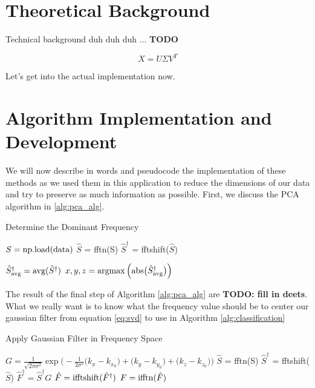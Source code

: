 \documentclass[11pt]{amsart}
\begin{document}
\section{Theoretical Background}\label{sec:theory}
Technical background duh duh duh ... \textbf{TODO}

\begin{equation}
X = U\Sigma V^T
\label{eq:svd}
\end{equation}

Let's get into the actual implementation now.

\section{Algorithm Implementation and Development}\label{sec:algorithms}
We will now describe in words and pseudocode the implementation of these methods as we used them in this application to reduce the dimensions of our data and try to preserve as much information as possible.
First, we discuss the PCA algorithm in \ref{alg:pca_alg}.

\begin{algorithm}
\caption{Determine the Dominant Frequency}\label{alg:pca_alg}
\begin{algorithmic}
\State $ S = {\rm np.load(data)}$ 
\State $\hat S$ = fftn(S)
\State $\hat S^\dag$ = fftshift($\hat S$) 

\State $\hat S^\dag_{\rm avg} = {\rm avg}(\hat S^\dag)$ 
\State $x, y, z = {\rm argmax} \left( {\rm abs} \big( \hat S^\dag_{\rm avg} \big) \right) $ 
\end{algorithmic}
\end{algorithm}

The result of the final step of Algorithm \ref{alg:pca_alg} are \textbf{TODO: fill in deets}.
What we really want is to know what the frequency value should be to center our gaussian filter from equation \eqref{eq:svd} to use in Algorithm \ref{alg:classification}

\begin{algorithm}
\caption{Apply Gaussian Filter in Frequency Space}\label{alg:classification}
\begin{algorithmic}
\State $ G = \frac {1}{\sqrt{2 \pi \sigma^2}}\exp \Big( - \frac{1}{2 \sigma^2 }\big(k_x - k_{x_0}\big) + \big(k_y - k_{y_0}\big) + \big(k_z - k_{z_0}\big) \Big)$ 
\State $\hat S$ = fftn(S)
\State $\hat S^\dag$ = fftshift($\hat S$)
\State $\hat F^\dag = \hat S^\dag G$ 
\State $\hat F = {\rm ifftshift}(\hat F^\dag)$
\State $F = {\rm ifftn}(\hat F)$ 
\end{algorithmic}
\end{algorithm}
\end{document}
